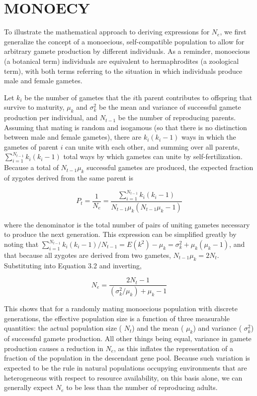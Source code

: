 \documentclass{article}
\begin{document}
\section{MONOECY}
To illustrate the mathematical approach to deriving expressions for  $ N_{e} $, we first generalize the concept of a monoecious, self-compatible population to allow for arbitrary gamete production by different individuals. As a reminder, monoecious (a botanical term) individuals are equivalent to hermaphrodites (a zoological term), with both terms referring to the situation in which individuals produce male and female gametes.

Let  $ k_i $ be the number of gametes that the  $ i $th parent contributes to offspring that survive to maturity,  $ \mu_k $ and  $ \sigma_k^2 $ be the mean and variance of successful gamete production per individual, and  $ N_{t-1} $ be the number of reproducing parents. Assuming that mating is random and isogamous (so that there is no distinction between male and female gametes), there are  $ k_i(k_i - 1) $ ways in which the gametes of parent  $ i $ can unite with each other, and summing over all parents,  $ \sum_{i=1}^{N_{t-1}} k_i(k_i - 1) $ total ways by which gametes can unite by self-fertilization. Because a total of  $ N_{t-1}\mu_k $ successful gametes are produced, the expected fraction of zygotes derived from the same parent is

\begin{equation}
P_{t}=\frac{1}{N_{e}}=\frac{\sum\limits_{i=1}^{N_{t-1}}k_{i}(k_{i}-1)}{N_{t-1}\mu_{k}(N_{t-1}\mu_{k}-1)}
\tag{3.2}
\label{eq:3_2}
\end{equation}

where the denominator is the total number of pairs of uniting gametes necessary to produce the next generation. This expression can be simplified greatly by noting that  $ \sum_{i=1}^{N_{t-1}} k_i(k_i - 1)/N_{t-1} = E(k^2) - \mu_k = \sigma_k^2 + \mu_k(\mu_k - 1) $, and that because all zygotes are derived from two gametes,  $ N_{t-1}\mu_k = 2N_t $. Substituting into Equation 3.2 and inverting,

\begin{equation}
N_{e}=\frac{2N_{t}-1}{(\sigma_{k}^{2}/\mu_{k})+\mu_{k}-1}
\tag{3.3}
\label{eq:3_3}
\end{equation}

This shows that for a randomly mating monoecious population with discrete generations, the effective population size is a function of three measurable quantities: the actual population size ( $ N_t $) and the mean ( $ \mu_k $) and variance ( $ \sigma_k^2 $) of successful gamete production. All other things being equal, variance in gamete production causes a reduction in  $ N_e $, as this inflates the representation of a fraction of the population in the descendant gene pool. Because such variation is expected to be the rule in natural populations occupying environments that are heterogeneous with respect to resource availability, on this basis alone, we can generally expect  $ N_e $ to be less than the number of reproducing adults.
\end{document}
